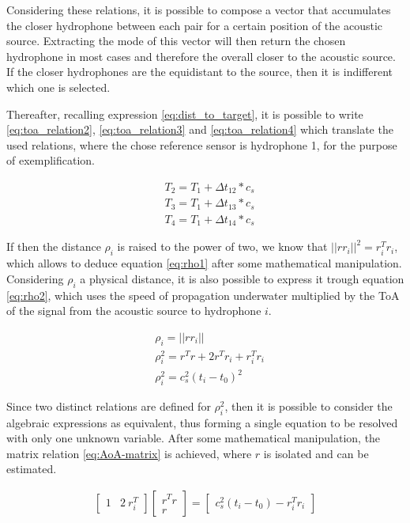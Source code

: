 Considering these relations, it is possible to compose a vector that accumulates the closer hydrophone between each pair for a certain position of the acoustic source. Extracting the mode of this vector will then return the chosen hydrophone in most cases and therefore the overall closer to the acoustic source. If the closer hydrophones are the equidistant to the source, then it is indifferent which one is selected.  

Thereafter, recalling expression \ref{eq:dist_to_target}, it is possible to write \ref{eq:toa_relation2}, \ref{eq:toa_relation3} and \ref{eq:toa_relation4} which translate the used relations, where  the chose reference sensor is hydrophone 1, for the purpose of exemplification.

\begin{eqnarray}
& T_2 = T_1 + \Delta t_{12} * c_s
\label{eq:toa_relation2}\\
& T_3 = T_1 + \Delta t_{13} * c_s
\label{eq:toa_relation3}\\
& T_4 = T_1 + \Delta t_{14} * c_s
\label{eq:toa_relation4}
\end{eqnarray}

If then the distance $\rho_i$ is raised to the power of two, we know that $||rr_i||^2 = r_i^{T}r_i$, which allows to deduce equation \ref{eq:rho1} after some mathematical manipulation. Considering $\rho_i$ a physical distance, it is also possible to express it trough equation \ref{eq:rho2}, which uses the speed of propagation underwater multiplied by the ToA of the signal from the acoustic source to hydrophone $i$.

\begin{eqnarray}
& \rho_i = ||rr_i|| 
\label{eq:rho}\\
&\rho_i^{2} =  r^{T}r + 2r^{T}r_i + r_i^{T}r_i
\label{eq:rho1}\\
&\rho_i^{2} = c_s^{2} (t_i-t_0)^{2}
\label{eq:rho2}
\end{eqnarray}

Since two distinct relations are defined for $\rho_i^{2}$, then it is possible to consider the algebraic expressions as equivalent, thus forming a single equation to be resolved with only one unknown variable. After some mathematical manipulation, the matrix relation \ref{eq:AoA-matrix} is achieved, where $r$ is isolated and can be estimated.

\begin{eqnarray}
\begin{bmatrix}
1 & 2\: r_i^{T}
\end{bmatrix}
\begin{bmatrix}
r^{T} r \\
r
\end{bmatrix}
=  
\begin{bmatrix}
c_s^{2} (t_i-t_0) - r_i^{T} r_i
\end{bmatrix}
\label{eq:AoA-matrix}
\end{eqnarray}
 
